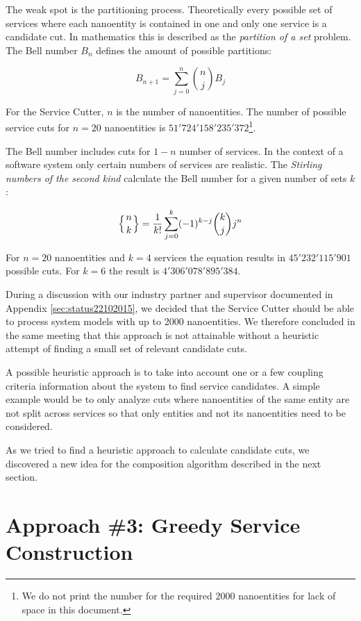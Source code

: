 The weak spot is the partitioning process. Theoretically every possible set of services where each nanoentity is contained in one and only one service is a candidate cut. In mathematics this is described as the \textit{partition of a set}\cite{partitionOfASet} problem. The Bell number $B_n$ defines the amount of possible partitions: 


\begin{displaymath}
B_{n+1}=\sum_{j=0}^n {n\choose j} B_j
\end{displaymath}

For the Service Cutter, $n$ is the number of nanoentities. The number of possible service cuts for $n=20$ nanoentities is $51'724'158'235'372$\footnote{We do not print the number for the required $2000$ nanoentities for lack of space in this document.}.

The Bell number includes cuts for $1 - n$ number of services. In the context of a software system only certain numbers of services are realistic. The \textit{Stirling numbers of the second kind} calculate the Bell number for a given number of sets $k$:

\begin{displaymath}
\left\{ {n \atop k}\right\} = \frac{1}{k!}\sum_{j=0}^{k} (-1)^{k-j} \binom{k}{j} j^n
\end{displaymath}

For $n=20$ nanoentities and $k=4$ services the equation results in $45'232'115'901$ possible cuts. For $k=6$ the result is $4'306'078'895'384$.

During a discussion with our industry partner and supervisor documented in Appendix \ref{sec:status22102015}, we decided that the Service Cutter should be able to process system models with up to 2000 nanoentities. We therefore concluded in the same meeting that this approach is not attainable without a heuristic attempt of finding a small set of relevant candidate cuts. 

A possible heuristic approach is to take into account one or a few coupling criteria information about the system to find service candidates. A simple example would be to only analyze cuts where nanoentities of the same entity are not split across services so that only entities and not its nanoentities need to be considered.

As we tried to find a heuristic approach to calculate candidate cuts, we discovered a new idea for the composition algorithm described in the next section. 

\section{Approach \#3: Greedy Service Construction}

